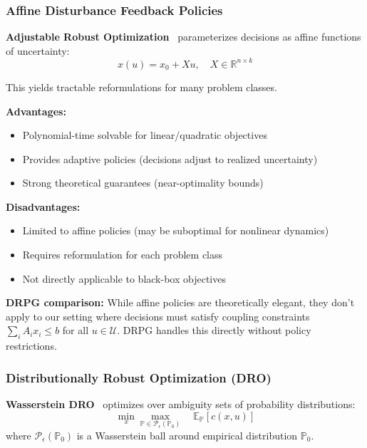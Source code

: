 \subsubsection{Affine Disturbance Feedback Policies}

\textbf{Adjustable Robust Optimization}~\cite{Ben-Tal2004,Chen2008} parameterizes decisions as affine functions of uncertainty:
\begin{equation}
x(u) = x_0 + X u, \quad X \in \mathbb{R}^{n \times k}
\end{equation}

This yields tractable reformulations for many problem classes.

\textbf{Advantages:}
\begin{itemize}
    \item Polynomial-time solvable for linear/quadratic objectives
    \item Provides adaptive policies (decisions adjust to realized uncertainty)
    \item Strong theoretical guarantees (near-optimality bounds)
\end{itemize}

\textbf{Disadvantages:}
\begin{itemize}
    \item Limited to affine policies (may be suboptimal for nonlinear dynamics)
    \item Requires reformulation for each problem class
    \item Not directly applicable to black-box objectives
\end{itemize}

\textbf{DRPG comparison:} While affine policies are theoretically elegant, they don't apply to our setting where decisions must satisfy coupling constraints $\sum_i A_i x_i \leq b$ for all $u \in \mathcal{U}$. DRPG handles this directly without policy restrictions.

\subsubsection{Distributionally Robust Optimization (DRO)}

\textbf{Wasserstein DRO}~\cite{Mohajerin2018,Kuhn2019} optimizes over ambiguity sets of probability distributions:
\begin{equation}
\min_x \max_{\mathbb{P} \in \mathcal{P}_\epsilon(\mathbb{P}_0)} \quad \mathbb{E}_{\mathbb{P}}[c(x, u)]
\end{equation}
where $\mathcal{P}_\epsilon(\mathbb{P}_0)$ is a Wasserstein ball around empirical distribution $\mathbb{P}_0$.

